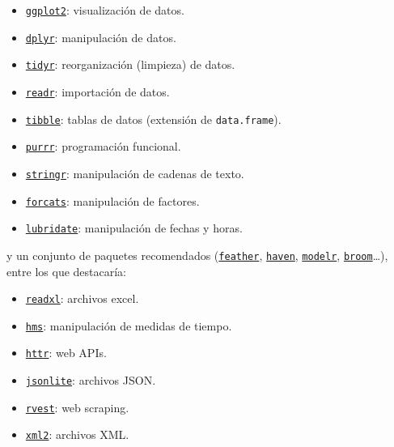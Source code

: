 \documentclass[
]{book}
\providecommand{\tightlist}{%
  \setlength{\itemsep}{0pt}\setlength{\parskip}{0pt}}
\theoremstyle{break}
\theoremstyle{nonumberplain}
\begin{document}
\begin{itemize}
\tightlist
\item
  \href{https://ggplot2.tidyverse.org}{\texttt{ggplot2}}: visualización de datos.
\item
  \href{https://dplyr.tidyverse.org}{\texttt{dplyr}}: manipulación de datos.
\item
  \href{https://tidyr.tidyverse.org}{\texttt{tidyr}}: reorganización (limpieza) de datos.
\item
  \href{https://readr.tidyverse.org}{\texttt{readr}}: importación de datos.
\item
  \href{https://tibble.tidyverse.org}{\texttt{tibble}}: tablas de datos (extensión de \texttt{data.frame}).
\item
  \href{https://purrr.tidyverse.org}{\texttt{purrr}}: programación funcional.
\item
  \href{https://github.com/tidyverse/stringr}{\texttt{stringr}}: manipulación de cadenas de texto.
\item
  \href{https://github.com/tidyverse/forcats}{\texttt{forcats}}: manipulación de factores.
\item
  \href{https://github.com/tidyverse/lubridate}{\texttt{lubridate}}: manipulación de fechas y horas.
\end{itemize}

y un conjunto de paquetes recomendados (\href{https://github.com/wesm/feather}{\texttt{feather}}, \href{https://github.com/tidyverse/haven}{\texttt{haven}}, \href{https://github.com/tidyverse/modelr}{\texttt{modelr}}, \href{https://github.com/tidymodels/broom}{\texttt{broom}}\ldots), entre los que destacaría:

\begin{itemize}
\tightlist
\item
  \href{https://github.com/tidyverse/readxl}{\texttt{readxl}}: archivos excel.
\item
  \href{https://github.com/tidyverse/hms}{\texttt{hms}}: manipulación de medidas de tiempo.
\item
  \href{https://github.com/r-lib/httr}{\texttt{httr}}: web APIs.
\item
  \href{https://github.com/jeroen/jsonlite}{\texttt{jsonlite}}: archivos JSON.
\item
  \href{https://github.com/tidyverse/rvest}{\texttt{rvest}}: web scraping.
\item
  \href{https://github.com/r-lib/xml2}{\texttt{xml2}}: archivos XML.
\end{itemize}
\end{document}
